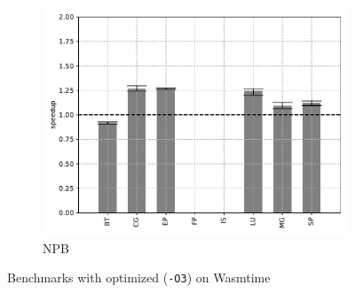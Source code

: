 \begin{figure}
\begin{subfigure}[t]{.45\textwidth}
        \includegraphics[width=\textwidth]
        {Images/6.1.RQ1/npb-wasmtime-opt.pdf}
        \caption{NPB}
    \end{subfigure}
    \caption{Benchmarks with optimized (\texttt{-O3}) on Wasmtime}
    \label{fig:rq1-wasmtime-opt}
\end{figure}

